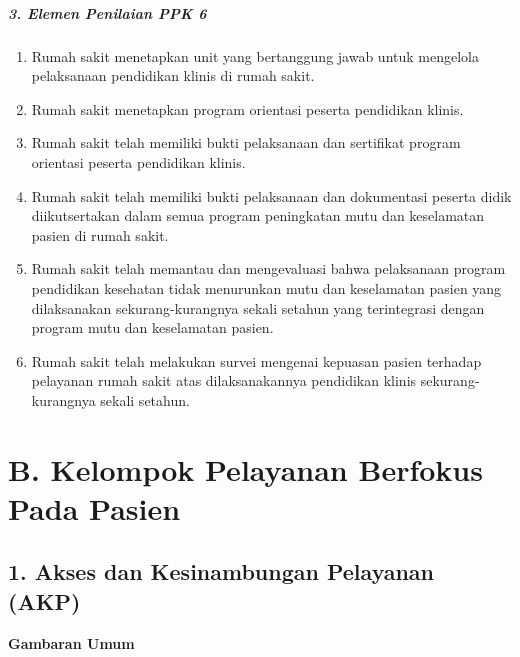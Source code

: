 \documentclass[
]{book}
\providecommand{\tightlist}{%
  \setlength{\itemsep}{0pt}\setlength{\parskip}{0pt}}
\begin{document}
\hypertarget{elemen-penilaian-ppk-6}{%
\paragraph*{3. Elemen Penilaian PPK 6}\label{elemen-penilaian-ppk-6}}

\begin{enumerate}
\def\labelenumi{\alph{enumi}.}
\tightlist
\item
  Rumah sakit menetapkan unit yang bertanggung jawab untuk mengelola pelaksanaan pendidikan klinis di rumah sakit.
\item
  Rumah sakit menetapkan program orientasi peserta pendidikan klinis.
\item
  Rumah sakit telah memiliki bukti pelaksanaan dan sertifikat program orientasi peserta pendidikan klinis.
\item
  Rumah sakit telah memiliki bukti pelaksanaan dan dokumentasi peserta didik diikutsertakan dalam semua program peningkatan mutu dan keselamatan pasien di rumah sakit.
\item
  Rumah sakit telah memantau dan mengevaluasi bahwa pelaksanaan program pendidikan kesehatan tidak menurunkan mutu dan keselamatan pasien yang dilaksanakan sekurang-kurangnya sekali setahun yang terintegrasi dengan program mutu dan keselamatan pasien.
\item
  Rumah sakit telah melakukan survei mengenai kepuasan pasien terhadap pelayanan rumah sakit atas dilaksanakannya pendidikan klinis sekurang- kurangnya sekali setahun.
\end{enumerate}

\hypertarget{b.-kelompok-pelayanan-berfokus-pada-pasien}{%
\chapter*{B. Kelompok Pelayanan Berfokus Pada Pasien}\label{b.-kelompok-pelayanan-berfokus-pada-pasien}}

\hypertarget{akses-dan-kesinambungan-pelayanan-akp}{%
\section*{1. Akses dan Kesinambungan Pelayanan (AKP)}\label{akses-dan-kesinambungan-pelayanan-akp}}

\textbf{Gambaran Umum}
\end{document}
